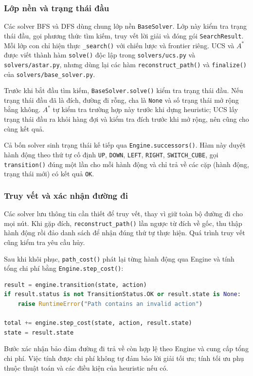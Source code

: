 \subsubsection{Lớp nền và trạng thái đầu}
Các solver BFS và DFS dùng chung lớp nền \texttt{BaseSolver}. Lớp này kiểm tra trạng thái đầu, gọi phương thức tìm kiếm, truy vết lời giải và đóng gói \texttt{SearchResult}. Mỗi lớp con chỉ hiện thực \texttt{\_search()} với chiến lược và frontier riêng. UCS và $A^*$ được viết thành hàm \texttt{solve()} độc lập trong \texttt{solvers/ucs.py} và \texttt{solvers/astar.py}, nhưng dùng lại các hàm \texttt{reconstruct\_path()} và \texttt{finalize()} của \texttt{solvers/base\_solver.py}.

Trước khi bắt đầu tìm kiếm, \texttt{BaseSolver.solve()} kiểm tra trạng thái đầu. Nếu trạng thái đầu đã là đích, đường đi rỗng, cha là \texttt{None} và số trạng thái mở rộng bằng không. $A^*$ tự kiểm tra trường hợp này trước khi dựng heuristic; UCS lấy trạng thái đầu ra khỏi hàng đợi và kiểm tra đích trước khi mở rộng, nên cũng cho cùng kết quả.

Cả bốn solver sinh trạng thái kế tiếp qua \texttt{Engine.successors()}. Hàm này duyệt hành động theo thứ tự cố định \texttt{UP}, \texttt{DOWN}, \texttt{LEFT}, \texttt{RIGHT}, \texttt{SWITCH\_CUBE}, gọi \texttt{transition()} đúng một lần cho mỗi hành động và chỉ trả về các cặp (hành động, trạng thái mới) có kết quả \texttt{OK}.

\subsubsection{Truy vết và xác nhận đường đi}
Các solver lưu thông tin cần thiết để truy vết, thay vì giữ toàn bộ đường đi cho mọi nút. Khi gặp đích, \texttt{reconstruct\_path()} lần ngược từ đích về gốc, thu thập hành động rồi đảo danh sách để nhận đúng thứ tự thực hiện. Quá trình truy vết cũng kiểm tra yêu cầu hủy.

Sau khi khôi phục, \texttt{path\_cost()} phát lại từng hành động qua Engine và tính tổng chi phí bằng \texttt{Engine.step\_cost()}:
\begin{lstlisting}[language=Python]
result = engine.transition(state, action)
if result.status is not TransitionStatus.OK or result.state is None:
    raise RuntimeError("Path contains an invalid action")

total += engine.step_cost(state, action, result.state)
state = result.state
\end{lstlisting}
Bước xác nhận bảo đảm đường đi trả về còn hợp lệ theo Engine và cung cấp tổng chi phí. Việc tính được chi phí không tự đảm bảo lời giải tối ưu; tính tối ưu phụ thuộc thuật toán và các điều kiện của heuristic nếu có.

